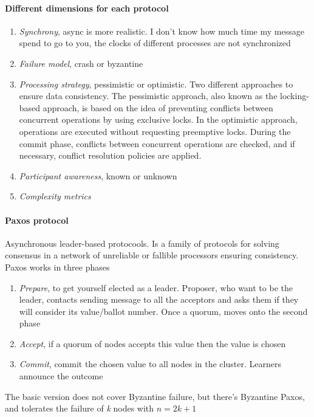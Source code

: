 \paragraph{Different dimensions for each protocol}
\begin{enumerate}
    \item \textit{Synchrony}, async is more realistic. I don't know how much time my message spend to go to you, the clocks of different processes are not synchronized
    \item \textit{Failure model}, crash or byzantine  
    \item \textit{Processing strategy}, pessimistic or optimistic. Two different approaches to ensure data consistency. The pessimistic approach, also known as the locking-based approach, is based on the idea of preventing conflicts between concurrent operations by using exclusive locks. In the optimistic approach, operations are executed without requesting preemptive locks. During the commit phase, conflicts between concurrent operations are checked, and if necessary, conflict resolution policies are applied.
    \item \textit{Participant awareness}, known or unknown 
    \item \textit{Complexity metrics} 
\end{enumerate}

\paragraph{Paxos protocol}
Asynchronous leader-based protocools. Is a family of protocols for solving consensus in a network of unreliable or fallible processors ensuring consistency. Paxos works in three phases
\begin{enumerate}
    \item \textit{Prepare}, to get yourself elected as a leader. Proposer, who want to be the leader, contacts sending message to all the acceptors and asks them if they will consider its value/ballot number. Once a quorum, moves onto the second phase
    \item \textit{Accept}, if a quorum of nodes accepts this value then the value is chosen
    \item \textit{Commit}, commit the chosen value to all nodes in the cluster. Learners announce the outcome
\end{enumerate}

The basic version does not cover Byzantine failure, but there’s Byzantine Paxos,  and tolerates the failure of \textit{k} nodes with $n=2k+1$

